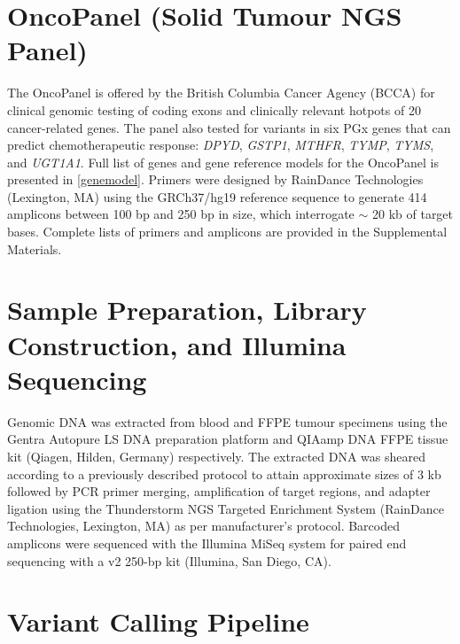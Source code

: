 \section{OncoPanel (Solid Tumour NGS Panel)}
\label{sec:OncoPanel}

The OncoPanel is offered by the British Columbia Cancer Agency (BCCA) for clinical genomic testing of coding exons and clinically relevant hotpots of 20 cancer-related genes. The panel also tested for variants in six PGx genes that can predict chemotherapeutic response: \textit{DPYD}, \textit{GSTP1}, \textit{MTHFR}, \textit{TYMP}, \textit{TYMS}, and \textit{UGT1A1}. Full list of genes and gene reference models for the OncoPanel is presented in \autoref{genemodel}. Primers were designed by RainDance Technologies (Lexington, MA) using the GRCh37/hg19 reference sequence to generate 414 amplicons between 100 bp and 250 bp in size, which interrogate $\sim$ 20 kb of target bases. Complete lists of primers and amplicons are provided in the Supplemental Materials.

\section{Sample Preparation, Library Construction, and Illumina Sequencing}
\label{sec:SamplePreparation,LibraryConstruction,andIlluminaSequencing}

Genomic DNA was extracted from blood and FFPE tumour specimens using the Gentra Autopure LS DNA preparation platform and QIAamp DNA FFPE tissue kit (Qiagen, Hilden, Germany) respectively. The extracted DNA was sheared according to a previously described protocol \cite{Bosdet2013} to attain approximate sizes of 3 kb followed by PCR primer merging, amplification of target regions, and adapter ligation using the Thunderstorm NGS Targeted Enrichment System (RainDance Technologies, Lexington, MA) as per manufacturer's protocol. Barcoded amplicons were sequenced with the Illumina MiSeq system for paired end sequencing with a v2 250-bp kit (Illumina, San Diego, CA).

\section{Variant Calling Pipeline}
\label{sec:VariantCallingPipeline}

